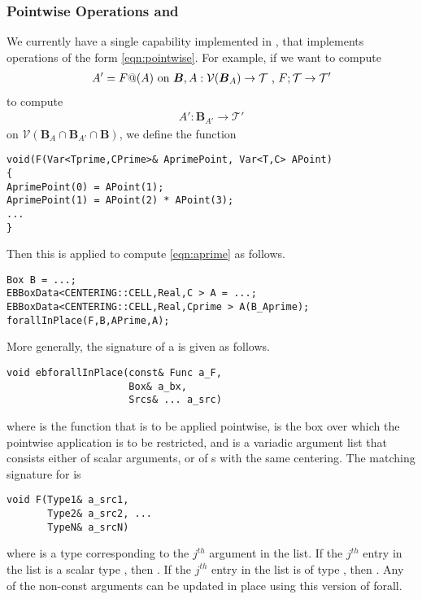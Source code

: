 \documentclass[12pt]{article}
\begin{document}
\subsubsection*{Pointwise Operations and }
We currently have a single  capability implemented in , that implements operations of the form
\eqref{eqn:pointwise}. For example, if we want to compute 
\begin{gather*}
A'= F@(A) \hbox{ on } \boldsymbol{B} , A:\mathcal{V}(\boldsymbol{B}_A) \rightarrow \mathcal{T} \hbox{ , } F ;\mathcal{T} \rightarrow \mathcal{T}'
\end{gather*}
to compute 
\begin{gather}
A' : \boldsymbol{B}_{A'} \rightarrow \mathcal{T}'  \label{eqn:aprime}
\end{gather}
on $\mathcal{V}(\boldsymbol{B}_A \cap \boldsymbol{B}_{A'} \cap \boldsymbol{B})$,
we define the function
\begin{verbatim}
void(F(Var<Tprime,CPrime>& AprimePoint, Var<T,C> APoint)
{
AprimePoint(0) = APoint(1);
AprimePoint(1) = APoint(2) * APoint(3);
...
}
\end{verbatim}
Then this is applied to compute \eqref{eqn:aprime} as follows.
\begin{verbatim}
Box B = ...;
EBBoxData<CENTERING::CELL,Real,C > A = ...;
EBBoxData<CENTERING::CELL,Real,Cprime > A(B_Aprime);
forallInPlace(F,B,APrime,A);
\end{verbatim}
More generally, the signature of a  is given as follows.
\begin{verbatim}
void ebforallInPlace(const& Func a_F,
                     Box& a_bx,
                     Srcs& ... a_src)
\end{verbatim}
where  is the function that is to be applied pointwise,  is the box over which the pointwise application is to be restricted, and  is a variadic argument list that consists either of scalar arguments, or of s with the same centering. The matching signature for  is 
\begin{verbatim}
void F(Type1& a_src1, 
       Type2& a_src2, ...
       TypeN& a_srcN)
\end{verbatim}
where  is a type corresponding to the $j^{th}$ argument in the    list. If the $j^{th}$ entry in the list is a scalar type , then . If the $j^{th}$ entry in the list is of type , then . Any of the non-const  arguments can be updated in place using this version of forall. 
\end{document}
